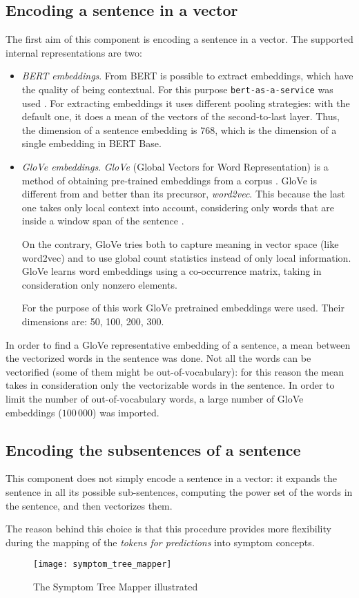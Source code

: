 \subsection{Encoding a sentence in a vector}
The first aim of this component is encoding a sentence in a vector. The supported internal representations are two:
\begin{itemize}
  \item \textit{BERT embeddings}. From BERT is possible to extract embeddings, which have the quality of being contextual. For this purpose \texttt{bert-as-a-service} was used \cite{baas}. For extracting embeddings it uses different pooling strategies: with the default one, it does a mean of the vectors of the second-to-last layer. Thus, the dimension of a sentence embedding is $768$, which is the dimension of a single embedding in BERT Base.
  \item \textit{GloVe embeddings}. \textit{GloVe} (Global Vectors for Word Representation) is a method of obtaining pre-trained embeddings from a corpus \cite{glove}. GloVe is different from and better than its precursor, \textit{word2vec}. This because the last one takes only local context into account, considering only words that are inside a window span of the sentence \cite{word2vec}.
  
  On the contrary, GloVe tries both to capture meaning in vector space (like word2vec) and to use global count statistics instead of only local information. GloVe learns word embeddings using a co-occurrence matrix, taking in consideration only nonzero elements.
  
  For the purpose of this work GloVe pretrained embeddings were used. Their dimensions are: 50, 100, 200, 300.
\end{itemize}

In order to find a GloVe representative embedding of a sentence, a mean between the vectorized words in the sentence was done. Not all the words can be vectorified (some of them might be out-of-vocabulary): for this reason the mean takes in consideration only the vectorizable words in the sentence. In order to limit the number of out-of-vocabulary words, a large number of GloVe embeddings ($100\,000$) was imported.

\subsection{Encoding the subsentences of a sentence}
This component does not simply encode a sentence in a vector: it expands the sentence in all its possible sub-sentences, computing the power set of the words in the sentence, and then vectorizes them.

The reason behind this choice is that this procedure provides more flexibility during the mapping of the \textit{tokens for predictions} into symptom concepts.

\begin{figure}[h]
\centering
\texttt{[image: symptom\_tree\_mapper]}
\caption{The Symptom Tree Mapper illustrated}
\medskip
\label{fig:symptom_t_m}
\end{figure}
